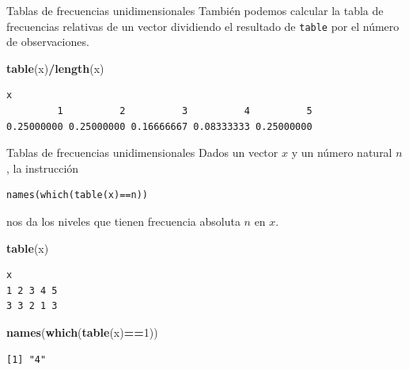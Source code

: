 \documentclass[
  ignorenonframetext,
]{beamer}
\newenvironment{Shaded}{\begin{snugshade}}{\end{snugshade}}
\newcommand{\DecValTok}[1]{\textcolor[rgb]{0.00,0.00,0.81}{#1}}
\newcommand{\FunctionTok}[1]{\textcolor[rgb]{0.13,0.29,0.53}{\textbf{#1}}}
\newcommand{\NormalTok}[1]{#1}
\newcommand{\SpecialCharTok}[1]{\textcolor[rgb]{0.81,0.36,0.00}{\textbf{#1}}}
\begin{document}
\begin{frame}[fragile]{Tablas de frecuencias unidimensionales}
\label{tablas-de-frecuencias-unidimensionales-11}
También podemos calcular la tabla de frecuencias relativas de un vector
dividiendo el resultado de \texttt{table} por el número de
observaciones.

\begin{Shaded}
\begin{Highlighting}[]
\FunctionTok{table}\NormalTok{(x)}\SpecialCharTok{/}\FunctionTok{length}\NormalTok{(x)}
\end{Highlighting}
\end{Shaded}

\begin{verbatim}
x
         1          2          3          4          5 
0.25000000 0.25000000 0.16666667 0.08333333 0.25000000 
\end{verbatim}
\end{frame}

\begin{frame}[fragile]{Tablas de frecuencias unidimensionales}
\label{tablas-de-frecuencias-unidimensionales-12}
Dados un vector \(x\) y un número natural \(n\), la instrucción

\begin{verbatim}
names(which(table(x)==n))
\end{verbatim}

nos da los niveles que tienen frecuencia absoluta \(n\) en \(x\).

\begin{Shaded}
\begin{Highlighting}[]
\FunctionTok{table}\NormalTok{(x)}
\end{Highlighting}
\end{Shaded}

\begin{verbatim}
x
1 2 3 4 5 
3 3 2 1 3 
\end{verbatim}

\begin{Shaded}
\begin{Highlighting}[]
\FunctionTok{names}\NormalTok{(}\FunctionTok{which}\NormalTok{(}\FunctionTok{table}\NormalTok{(x)}\SpecialCharTok{==}\DecValTok{1}\NormalTok{))}
\end{Highlighting}
\end{Shaded}

\begin{verbatim}
[1] "4"
\end{verbatim}
\end{frame}
\end{document}
